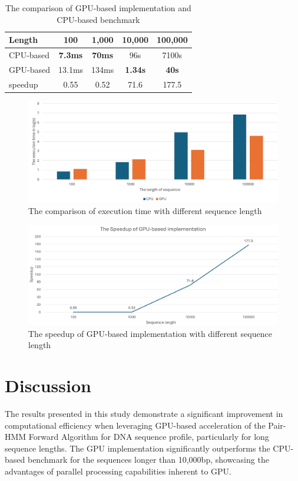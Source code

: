 \documentclass[PhD]{PHlab-thesis}
\begin{document}
\begin{table}[h]
    \centering
    \begin{tabular}{|l|c|c|c|c|}
        \hline
        Length &100& 1,000 & 10,000 & 100,000\\
        \hline
        CPU-based & \textbf{7.3ms}& \textbf{70ms}& 96s &7100s\\
        \hline
        GPU-based &13.1ms & 134ms& \textbf{1.34s}&\textbf{40s}\\
        \hline
        speedup & 0.55 & 0.52 & 71.6 & 177.5\\
        \hline
    \end{tabular}
    \caption{The comparison of GPU-based implementation and CPU-based benchmark}
    \label{tab:GPUCPU and Speedup}
\end{table}

\begin{figure}[h]
    \centering
    \includegraphics[width=1\linewidth]{figure/GPUCPU.jpg}
    \caption{The comparison of execution time with different sequence length}
    \label{fig:GPUCPU}
\end{figure}

\begin{figure}[h]
    \centering
    \includegraphics[width=0.9\linewidth]{figure/Speedup.png}
    \caption{The speedup of GPU-based implementation with different sequence length}
    \label{fig:speedup}
\end{figure}

\chapter{Discussion}
The results presented in this study demonstrate a significant improvement in computational efficiency when leveraging GPU-based acceleration of the Pair-HMM Forward Algorithm for DNA sequence profile, particularly for long sequence lengths. The GPU implementation significantly outperforms the CPU-based benchmark for the sequences longer than 10,000bp, showcasing the advantages of parallel processing capabilities inherent to GPU.
\end{document}
